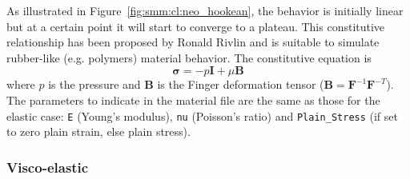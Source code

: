 \documentclass[a4paper,11pt]{book}
\newcommand{\code}[1]{\texttt{#1}}
\newcommand{\mat}[1]{\ensuremath{\boldsymbol{#1}}}
\begin{document}
As illustrated in Figure~\ref{fig:smm:cl:neo_hookean}, the behavior is initially linear but at a certain point it will start to converge to a plateau.
This constitutive relationship has been proposed by Ronald Rivlin and is suitable to simulate rubber-like (e.g. polymers) material behavior. The constitutive equation is 
\begin{equation}
\mat{\sigma } = -p \mat{I} + \mu \mat{B}
\end{equation}
where $p$ is the pressure and $\mat{B}$ is the Finger deformation tensor ($\mat{B}=\mat{F}^{-1}\mat{F}^{-T}$).
The parameters to indicate in the material file are the same as those for the elastic case: \code{E} (Young's modulus), \code{nu} (Poisson's ratio) and \code{Plain\_Stress} (if set to zero plain strain, else plain stress).

\subsubsection{Visco-elastic}
\end{document}
